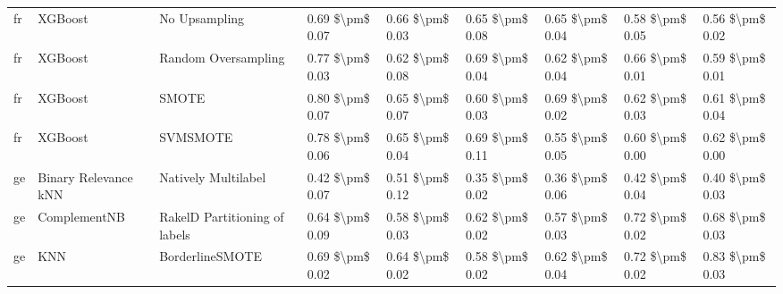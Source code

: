 \begin{tabular}{lllllllll}
      fr &                         XGBoost &                 No Upsampling &     0.69 \$\textbackslash pm\$ 0.07 &           0.66 \$\textbackslash pm\$ 0.03 &       0.65 \$\textbackslash pm\$ 0.08 &        0.65 \$\textbackslash pm\$ 0.04 &                         0.58 \$\textbackslash pm\$ 0.05 &     0.56 \$\textbackslash pm\$ 0.02 \\
      fr &                         XGBoost &           Random Oversampling &     0.77 \$\textbackslash pm\$ 0.03 &           0.62 \$\textbackslash pm\$ 0.08 &       0.69 \$\textbackslash pm\$ 0.04 &        0.62 \$\textbackslash pm\$ 0.04 &                         0.66 \$\textbackslash pm\$ 0.01 &     0.59 \$\textbackslash pm\$ 0.01 \\
      fr &                         XGBoost &                         SMOTE &     0.80 \$\textbackslash pm\$ 0.07 &           0.65 \$\textbackslash pm\$ 0.07 &       0.60 \$\textbackslash pm\$ 0.03 &        0.69 \$\textbackslash pm\$ 0.02 &                         0.62 \$\textbackslash pm\$ 0.03 &     0.61 \$\textbackslash pm\$ 0.04 \\
      fr &                         XGBoost &                      SVMSMOTE &     0.78 \$\textbackslash pm\$ 0.06 &           0.65 \$\textbackslash pm\$ 0.04 &       0.69 \$\textbackslash pm\$ 0.11 &        0.55 \$\textbackslash pm\$ 0.05 &                         0.60 \$\textbackslash pm\$ 0.00 &     0.62 \$\textbackslash pm\$ 0.00 \\
      ge &            Binary Relevance kNN &           Natively Multilabel &     0.42 \$\textbackslash pm\$ 0.07 &           0.51 \$\textbackslash pm\$ 0.12 &       0.35 \$\textbackslash pm\$ 0.02 &        0.36 \$\textbackslash pm\$ 0.06 &                         0.42 \$\textbackslash pm\$ 0.04 &     0.40 \$\textbackslash pm\$ 0.03 \\
      ge &                    ComplementNB & RakelD Partitioning of labels &     0.64 \$\textbackslash pm\$ 0.09 &           0.58 \$\textbackslash pm\$ 0.03 &       0.62 \$\textbackslash pm\$ 0.02 &        0.57 \$\textbackslash pm\$ 0.03 &                         0.72 \$\textbackslash pm\$ 0.02 &     0.68 \$\textbackslash pm\$ 0.03 \\
      ge &                             KNN &               BorderlineSMOTE &     0.69 \$\textbackslash pm\$ 0.02 &           0.64 \$\textbackslash pm\$ 0.02 &       0.58 \$\textbackslash pm\$ 0.02 &        0.62 \$\textbackslash pm\$ 0.04 &                         0.72 \$\textbackslash pm\$ 0.02 &     0.83 \$\textbackslash pm\$ 0.03 \\

\end{tabular}
